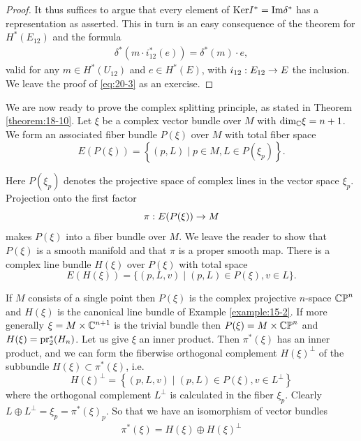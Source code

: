 \begin{proof}
  It thus suffices to argue that every element of $\mathrm{Ker}{I}^* = \mathrm{Im}{\delta }^*$ has 
  a representation as asserted. This in turn is an easy consequence of the theorem for $H^*( E_{12})$ 
  and the formula
  \begin{align}\label{eq:20-3}
    {\delta }^*( {m \cdot  {i}_{12}^*( e) })  = {\delta }^*( m)  \cdot  e,
  \end{align}
  valid for any $m \in  H^*( U_{12})$ and $e \in  H^*( E)$, with ${i}_{12} : E_{12} \rightarrow  E$ the inclusion. 
  We leave the proof of \eqref{eq:20-3} as an exercise.
\end{proof}

We are now ready to prove the complex splitting principle, as stated in Theorem \ref{theorem:18-10}. 
Let $\xi$ be a complex vector bundle over $M$ with ${\dim }_{\mathbb{C}}\xi  = n + 1$. We form an associated 
fiber bundle $P( \xi )$ over $M$ with total fiber space
\[
  E( {P( \xi ) })  = \left\{  {( {p,L})  \mid  p \in  M,L \in  P( {\xi_p}) }\right\} .
\]

Here $P( {\xi_p})$ denotes the projective space of complex lines in the vector space ${\xi_p}$. Projection 
onto the first factor
\[
  \pi: E( {P( \xi ) })  \rightarrow  M
\]
makes $P( \xi )$ into a fiber bundle over $M$. We leave the reader to show that $P( \xi )$ is a smooth manifold 
and that $\pi$ is a proper smooth map. There is a complex line bundle $H( \xi )$ over $P( \xi )$ with total space
\[
  E( {H( \xi ) })  = \{ ( {p,L,v})  \mid  ( {p,L})  \in  P( \xi ),v \in  L\}.
\]

If $M$ consists of a single point then $P( \xi )$ is the complex projective $n$-space ${\mathbb{CP}^n}$ and $H( \xi )$ 
is the canonical line bundle of Example \ref{example:15-2}. If more generally $\xi  = M \times  {\ensuremath{\mathbb{C}}}^{n + 1}$ is the trivial 
bundle then $P( \xi )  = M \times  {\mathbb{CP}^n}$ and $H( \xi )  = {\mathrm{pr}}_{2}^*( H_{n})$. Let us give $\xi$ 
an inner product. Then ${\pi }^*( \xi )$ has an inner product, and we can form the fiberwise orthogonal 
complement $H{( \xi ) }^{ \bot  }$ of the subbundle $H( \xi )  \subset  {\pi }^*( \xi )$, i.e.
\[
  H{( \xi ) }^{ \bot  } = \left\{  {( {p,L,v})  \mid  ( {p,L})  \in  P( \xi ),v \in  {L}^{ \bot  }}\right\}
\]
where the orthogonal complement ${L}^{ \bot  }$ is calculated in the fiber ${\xi_p}$. 
Clearly $L \oplus  {L}^{ \bot  } = {\xi_p} = {\pi }^*{( \xi ) }_{p}$. So that we have 
an isomorphism of vector bundles
\begin{align}\label{eq:20-4}
  {\pi }^*( \xi )  = H( \xi )  \oplus  H{( \xi ) }^{ \bot  }
\end{align}

